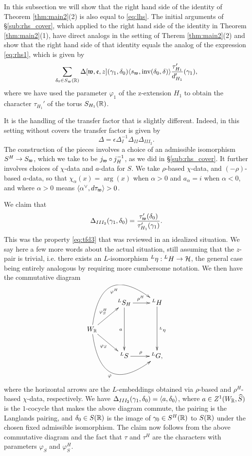 \documentclass{article}
\theoremstyle{definition}
\numberwithin{equation}{section}
\renewcommand{\-}{\hyp{}}
\begin{document}
In this subsection we will show that the right hand side of the identity of Theorem \ref{thm:main2}(2) is also equal to \eqref{eq:lhs}. The initial arguments of \S\ref{sub:rhs_cover}, which applied to the right hand side of the identity in Theorem \ref{thm:main2}(1), have direct analogs in the setting of Therem \ref{thm:main2}(2) and show that the right hand side of that identity equals the analog of the expression \eqref{eq:rhs1}, which is given by
\begin{equation} \label{eq:rhs2}
\sum_{\delta_0 \in S_{\mathfrak{w}}(\mathbb{R})} \Delta[\mathfrak{w},\mathfrak{e},z](\gamma_1,\delta_0)\langle s_{\mathfrak{w}},\textrm{inv}(\delta_0,\delta)\rangle \frac{\tau'_{H_1}}{d'_{H_1}}(\gamma_1),	
\end{equation}
where we have used the parameter $\varphi_1$ of the z-extension $H_1$ to obtain the character $\tau_{H_1}'$ of the torus $S_{H_1}(\mathbb{R})$.


It is the handling of the transfer factor that is slightly different. Indeed, in this setting without covers the transfer factor is given by
\[ \Delta = \epsilon\Delta_I^{-1}\Delta_{II}\Delta_{III_2}. \]
The construction of the pieces involves a choice of an admissible isomorphism $S^H \to S_{\mathfrak{w}}$, which we take to be $j_{\mathfrak{w}}\circ j_H^{-1}$, as we did in \S\ref{sub:rhs_cover}. It further involves choices of $\chi$-data and $a$-data for $S$. We take $\rho$-based $\chi$-data, and $(-\rho)$-based $a$-data, so that $\chi_\alpha(x)=\arg(x)$ when $\alpha>0$ and $a_\alpha=i$ when $\alpha<0$, and where $\alpha>0$ means $\langle\alpha^\vee,d\tau_{\mathfrak{w}}\rangle>0$.

We claim that
\[ \Delta_{III_2}(\gamma_1,\delta_0) = \frac{\tau'_{\mathfrak{w}}(\delta_0)}{\tau'_{H_1}(\gamma_1)}.\]
This was the property \eqref{eq:tfd3} that was reviewed in an idealized situation. We say here a few more words about the actual situation, still assuming that the $z$-pair is trivial, i.e. there exists an $L$\-isomorphism $^L\eta : {^LH} \to \mathcal{H}$, the general case being entirely analogous by requiring more cumbersome notation. We then have the commutative diagram
\[ \xymatrix{
	&^LS_H\ar[dd]_a\ar[r]^{\rho^H}&^LH\ar[dd]^{^L\eta}\\
	W_\R\ar[ru]^{\varphi^H_S}\ar@/^4pc/[rru]_-{\varphi^H}\ar[rd]_{\varphi_S}\ar@/_4pc/[rrd]_-{\varphi}\\
	&^LS\ar[r]^{\rho}&^LG,
}
\]
where the horizontal arrows are the $L$\-embeddings obtained via $\rho$-based and $\rho^H$-based $\chi$-data, respectively. We have $\Delta_{III_2}(\gamma_1,\delta_0)=\langle a,\delta_0\rangle$, where $a \in Z^1(W_{\mathbb{R}},\widehat S)$ is the $1$-cocycle that makes the above diagram commute, the pairing is the Langlands pairing, and $\delta_0 \in S(\mathbb{R})$ is the image of $\gamma_0 \in S^H(\mathbb{R})$ to $S(\mathbb{R})$ under the chosen fixed admissible isomorphism. The claim now follows from the above commutative diagram and the fact that $\tau$ and $\tau^H$ are the characters with parameters $\varphi_S$ and $\varphi_S^H$.
\end{document}
